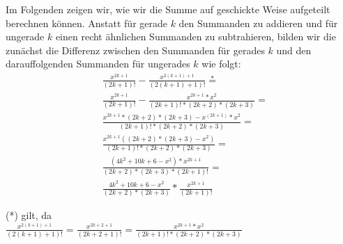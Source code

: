 \documentclass[12pt]{report}
\begin{document}
Im Folgenden zeigen wir, wie wir die Summe auf geschickte Weise aufgeteilt berechnen können.
Anstatt für gerade $k$ den Summanden zu addieren und für ungerade $k$ einen recht ähnlichen Summanden zu subtrahieren, 
bilden wir die zunächst die Differenz zwischen den Summanden für gerades $k$ und den darauffolgenden Summanden für ungerades $k$ wie folgt:
\begin{align*}
  &\frac{x^{2k+1}}{(2k+1)!} - \frac{x^{2(k+1)+1}}{(2(k+1)+1)!} \overset{*}{=}\\[5mm]
  &\frac{x^{2k+1}}{(2k+1)!} - \frac{x^{2k+1}*x^2}{(2k+1)! * (2k+2) * (2k+3)} = \\[5mm]
  &\frac{x^{2k+1} * (2k+2) * (2k+3) - x^(2k+1)*x^2}{(2k+1)! * (2k+2) * (2k+3)} =\\[5mm]
  &\frac{x^{2k+1} ((2k+2) * (2k+3) - x^2)}{(2k+1)! * (2k+2) * (2k+3)} =\\[5mm]
  &\frac{(4k^2+ 10k + 6 - x^2)*x^{2k+1}}{(2k+2) * (2k+3) * (2k+1)!} =\\[5mm]
  &\frac{4k^2+ 10k + 6 - x^2}{(2k+2) * (2k+3)} * \frac{x^{2k+1}}{(2k+1)!}
\end{align*}

(*) gilt, da\\
$\frac{x^{2(k+1)+1}}{(2(k+1)+1)!} = \frac{x^{2k+2+1}}{(2k+2+1)!} = \frac{x^{2k+1}*x^2}{(2k+1)! * (2k+2) * (2k+3)}$\\
\end{document}
